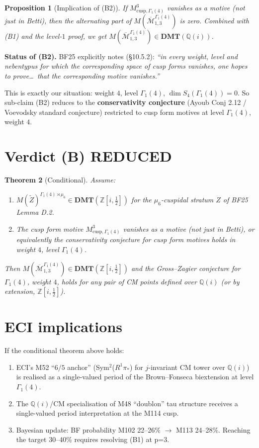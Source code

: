 \documentclass[11pt]{article}
\newtheorem{theorem}{Theorem}
\newtheorem{proposition}[theorem]{Proposition}
\theoremstyle{definition}
\newcommand{\MM}{\overline{\mathcal{M}}}
\newcommand{\Z}{\mathbb{Z}}
\newcommand{\Q}{\mathbb{Q}}
\newcommand{\DMT}{\mathbf{DMT}}
\begin{document}
\begin{proposition}[Implication of (B2)]
If $M^3_{\mathrm{cusp}, \Gamma_1(4)}$ vanishes as a motive (not just in Betti),
then the alternating part of $M(\MM_{1,3}^{\Gamma_1(4)})$ is zero. Combined with
(B1) and the level-$1$ proof, we get $M(\MM_{1,3}^{\Gamma_1(4)}) \in \DMT(\Q(i))$.
\end{proposition}

\textbf{Status of (B2).} BF25 explicitly notes (\S 10.5.2):
\textit{``in every weight, level and nebentypus for which the corresponding space of
cusp forms vanishes, one hopes to prove\ldots\ that the corresponding motive vanishes.''}

This is exactly our situation: weight $4$, level $\Gamma_1(4)$,
$\dim S_4(\Gamma_1(4)) = 0$. So sub-claim (B2) reduces to the
\textbf{conservativity conjecture} (Ayoub Conj 2.12 / Voevodsky standard
conjecture) restricted to cusp form motives at level $\Gamma_1(4)$, weight $4$.

\section{Verdict (B) REDUCED}

\begin{theorem}[Conditional]
Assume:
\begin{enumerate}
\item[(B1)] $M(\widetilde{Z})^{\Gamma_1(4)\rtimes \mu_6} \in \DMT(\Z[i,\tfrac{1}{2}])$
            for the $\mu_6$-cuspidal stratum $Z$ of BF25 Lemma D.2.
\item[(B2)] The cusp form motive $M^3_{\mathrm{cusp}, \Gamma_1(4)}$ vanishes as a
            motive (not just in Betti), \emph{or equivalently} the conservativity
            conjecture for cusp form motives holds in weight $4$, level $\Gamma_1(4)$.
\end{enumerate}
Then $M(\MM_{1,3}^{\Gamma_1(4)}) \in \DMT(\Z[i,\tfrac{1}{2}])$ and the
Gross--Zagier conjecture for $\Gamma_1(4)$, weight $4$, holds for any pair of CM points
defined over $\Q(i)$ (or by extension, $\Z[i,\tfrac{1}{2}]$).
\end{theorem}

\section{ECI implications}

If the conditional theorem above holds:
\begin{enumerate}
\item ECI's M52 ``$6/5$ anchor'' (Sym$^2$($R^1\pi_*$) for $j$-invariant CM tower over $\Q(i)$)
       is realised as a single-valued period of the Brown--Fonseca biextension
       at level $\Gamma_1(4)$.
\item The $\Q(i)$/CM specialisation of M48 ``doublon'' tau structure
       receives a single-valued period interpretation at the M114 cusp.
\item Bayesian update: BF probability M102 22--26\% $\to$ M113 24--28\%.
       Reaching the target 30--40\% requires resolving (B1) at p=3.
\end{enumerate}
\end{document}
